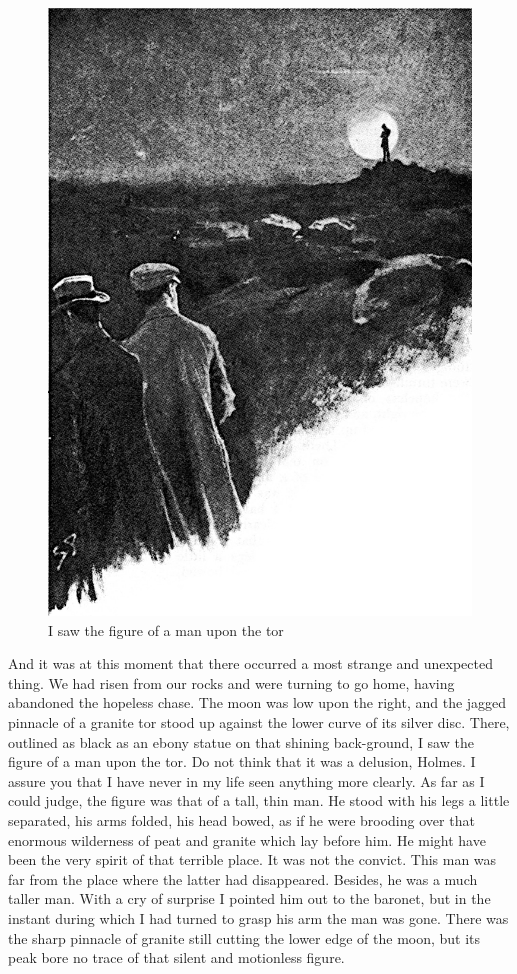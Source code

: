 \documentclass[paper=a5,BCOR=7mm,twoside,DIV=calc,12pt,usegeometry,openany,chapterprefix,endperiod,headings=big]{scrbook} %
\begin{document}
\begin{figure}[p!h!]
\centering
\includegraphics[width=\linewidth]{09_manontor}
\caption{I saw the figure of a man upon the tor}
\end{figure}

And it was at this moment that there occurred a most strange and unexpected thing. We had risen from our rocks and were turning to go home, having abandoned the hopeless chase. The moon was low upon the right, and the jagged pinnacle of a granite tor stood up against the lower curve of its silver disc. There, outlined as black as an ebony statue on that shining back-ground, I saw the figure of a man upon the tor. Do not think that it was a delusion, Holmes. I assure you that I have never in my life seen anything more clearly. As far as I could judge, the figure was that of a tall, thin man. He stood with his legs a little separated, his arms folded, his head bowed, as if he were brooding over that enormous wilderness of peat and granite which lay before him. He might have been the very spirit of that terrible place. It was not the convict. This man was far from the place where the latter had disappeared. Besides, he was a much taller man. With a cry of surprise I pointed him out to the baronet, but in the instant during which I had turned to grasp his arm the man was gone. There was the sharp pinnacle of granite still cutting the lower edge of the moon, but its peak bore no trace of that silent and motionless figure.
\end{document}
